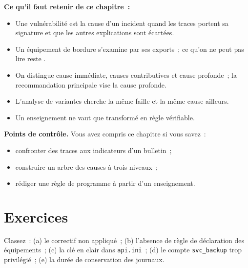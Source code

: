 \begin{boxresume}
\textbf{Ce qu'il faut retenir de ce chapitre~:}
\begin{itemize}
    \item Une vulnérabilité est la cause d'un incident quand les traces
          portent sa signature et que les autres explications sont
          écartées.
    \item Un équipement de bordure s'examine par ses exports~; ce qu'on ne
          peut pas lire reste \NEK{}.
    \item On distingue cause immédiate, causes contributives et cause
          profonde~; la recommandation principale vise la cause profonde.
    \item L'analyse de variantes cherche la même faille et la même cause
          ailleurs.
    \item Un enseignement ne vaut que transformé en règle vérifiable.
\end{itemize}
\end{boxresume}

\begin{boxinfo}
\textbf{Points de contrôle.} Vous avez compris ce chapitre si vous savez~:
\begin{itemize}
    \item confronter des traces aux indicateurs d'un bulletin~;
    \item construire un arbre des causes à trois niveaux~;
    \item rédiger une règle de programme à partir d'un enseignement.
\end{itemize}
\end{boxinfo}

\section*{Exercices}

\begin{boxexo}[title={\ding{45}\quad Exercice~12.1. Immédiate, contributive, profonde \niveaubase}]
Classez~: (a) le correctif non appliqué~; (b) l'absence de règle de
déclaration des équipements~; (c) la clé en clair dans \texttt{api.ini}~;
(d) le compte \texttt{svc\_backup} trop privilégié~; (e) la durée de
conservation des journaux.
\end{boxexo}

